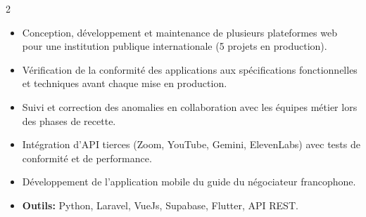 \documentclass[10pt,a4paper,ragged2e,withhyper]{altacv}
\begin{document}
\begin{paracol}{2}
        
        

            
            
            
            \begin{itemize}
                \item Conception, développement et maintenance de plusieurs plateformes web pour une institution publique internationale (5 projets en production).
                \item Vérification de la conformité des applications aux spécifications fonctionnelles et techniques avant chaque mise en production.
                \item Suivi et correction des anomalies en collaboration avec les équipes métier lors des phases de recette.
                \item Intégration d'API tierces (Zoom, YouTube, Gemini, ElevenLabs) avec tests de conformité et de performance.
                \item Développement de l'application mobile du guide du négociateur francophone.
                \item \textcolor{SecondaryColor}{\textbf{Outils: }} Python, Laravel, VueJs, Supabase, Flutter, API REST.
            \end{itemize}
            \divider


\end{paracol}
\end{document}
